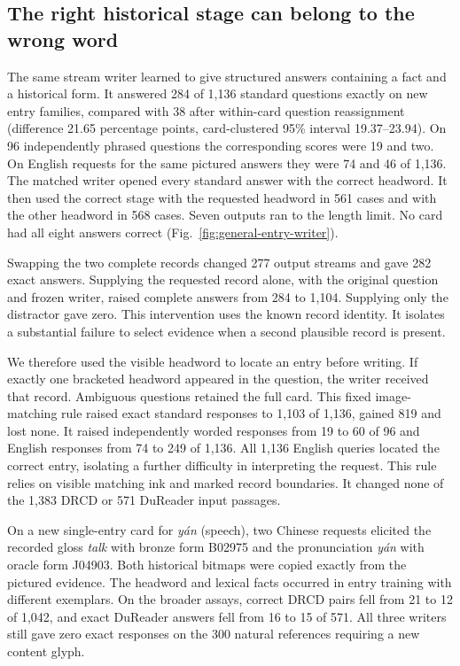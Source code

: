 \documentclass[12pt,a4paper]{article}
\providecommand{\DIFadd}[1]{{\protect\color{blue} \sf #1}} %
\begin{document}
\subsection*{\DIFadd{The right historical stage can belong to the wrong word}}
\DIFadd{The same stream writer learned to give structured answers containing a fact and a historical form. It answered 284 of 1,136 standard questions exactly on new entry families, compared with 38 after within-card question reassignment (difference 21.65 percentage points, card-clustered 95\% interval 19.37--23.94). On 96 independently phrased questions the corresponding scores were 19 and two. On English requests for the same pictured answers they were 74 and 46 of 1,136. The matched writer opened every standard answer with the correct headword. It then used the correct stage with the requested headword in 561 cases and with the other headword in 568 cases. Seven outputs ran to the length limit. No card had all eight answers correct (Fig.~\ref{fig:general-entry-writer}).
}

\DIFadd{Swapping the two complete records changed 277 output streams and gave 282 exact answers. Supplying the requested record alone, with the original question and frozen writer, raised complete answers from 284 to 1,104. Supplying only the distractor gave zero. This intervention uses the known record identity. It isolates a substantial failure to select evidence when a second plausible record is present.
}

\DIFadd{We therefore used the visible headword to locate an entry before writing. If exactly one bracketed headword appeared in the question, the writer received that record. Ambiguous questions retained the full card. This fixed image-matching rule raised exact standard responses to 1,103 of 1,136, gained 819 and lost none. It raised independently worded responses from 19 to 60 of 96 and English responses from 74 to 249 of 1,136. All 1,136 English queries located the correct entry, isolating a further difficulty in interpreting the request. This rule relies on visible matching ink and marked record boundaries. It changed none of the 1,383 DRCD or 571 DuReader input passages.
}

\DIFadd{On a new single-entry card for \textit{y\'an} (speech), two Chinese requests elicited the recorded gloss \textit{talk} with bronze form B02975 and the pronunciation \textit{y\'an} with oracle form J04903. Both historical bitmaps were copied exactly from the pictured evidence. The headword and lexical facts occurred in entry training with different exemplars. On the broader assays, correct DRCD pairs fell from 21 to 12 of 1,042, and exact DuReader answers fell from 16 to 15 of 571. All three writers still gave zero exact responses on the 300 natural references requiring a new content glyph.
}
\end{document}
